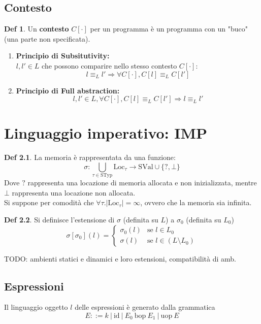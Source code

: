 \documentclass[a4paper]{report}
\newcommand{\bop}{\ \mathrm{bop}\ }
\newcommand{\uop}{\mathrm{uop}\ }
\theoremstyle{definition} \newtheorem*{defi}{Def}
\theoremstyle{plain} \newtheorem{lemma}{Lemma}
\theoremstyle{plain} \newtheorem{teo}{Teorema}
\theoremstyle{remark} \newtheorem*{es}{Esempio}
\begin{document}
\section{Contesto}
\begin{defi}
	Un {\bf contesto} $C[\cdot]$ per un programma è un programma con un "buco" (una parte non specificata).
	\end{defi}
	\begin{enumerate}
	\item {\bf Principio di Subsitutivity:}
	\\
	$l, l' \in L$ che possono comparire nello stesso contesto $C[\cdot]$:
	$$
		l \equiv_L l' \Rightarrow \forall C[\cdot] , C[l] \equiv_L C[l']
	$$
	\item {\bf Principio di Full abstraction:}
	$$
		l,l' \in L, \forall C[\cdot], C[l] \equiv_L C[l'] \Longrightarrow l \equiv_L l'
	$$
\end{enumerate}

\chapter{Linguaggio imperativo: IMP}
\begin{defi}
  La memoria è rappresentata da una funzione:
  \begin{equation}
    \sigma:\bigcup_{\tau \in \mathrm{STyp}} \mathrm{Loc}_\tau \rightarrow \mathrm{SVal} \cup \{?,\bot\}
  \end{equation}
  Dove $?$ rappresenta una locazione di memoria allocata e non inizializzata,
  mentre $\bot$ rappresenta una locazione non allocata.\\
  Si suppone per comodità che $\forall \tau.\lvert\mathrm{Loc}_\tau\rvert = \infty$,
  ovvero che la memoria sia infinita.
\end{defi}
\begin{defi}
  Si definisce l'estensione di $\sigma$ (definita su $L$) a $\sigma_0$ (definita su $L_0$)
  \begin{equation}
    \sigma[\sigma_0](l)=
    \begin{cases}
      \sigma_0(l) & \text{se } l \in L_0 \\
      \sigma(l) & \text{se } l \in (L \setminus L_0)
    \end{cases}
  \end{equation}
\end{defi}
TODO: ambienti statici e dinamici e loro estensioni, compatibilità di amb.
\section{Espressioni}
Il linguaggio oggetto $l$ delle espressioni è generato dalla grammatica
\[E \mathrel{::=} k\ | \mathrm{\ id\ } |\ E_0 \bop E_1\ |\ \uop E \]
\end{document}
